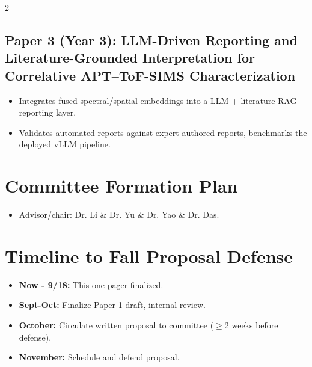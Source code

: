 \documentclass[9pt]{extarticle}
\begin{document}
\begin{multicols}{2}
\subsection{Paper 3 (Year 3): LLM-Driven Reporting and Literature-Grounded Interpretation for Correlative APT--ToF-SIMS Characterization}
\begin{itemize}
\item Integrates fused spectral/spatial embeddings into a LLM + literature RAG reporting layer.
\item Validates automated reports against expert-authored reports, benchmarks the deployed vLLM pipeline.
\end{itemize}

\section{Committee Formation Plan}
\begin{itemize}
\item Advisor/chair: Dr. Li \& Dr. Yu \& Dr. Yao \& Dr. Das.
\end{itemize}

\section{Timeline to Fall Proposal Defense}
\begin{itemize}
\item \textbf{Now - 9/18:} This one-pager finalized.
\item \textbf{Sept-Oct:} Finalize Paper 1 draft, internal review.
\item \textbf{October:} Circulate written proposal to committee ($\geq$2 weeks before defense).
\item \textbf{November:} Schedule and defend proposal.
\end{itemize}

\end{multicols}
\end{document}
